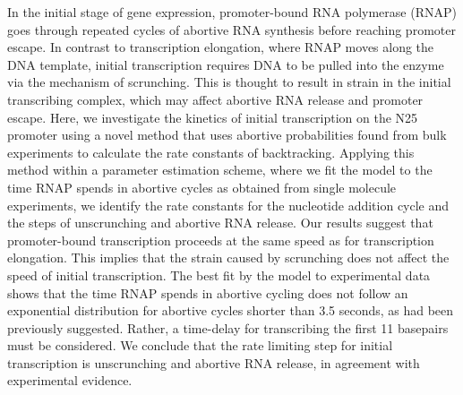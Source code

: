 In the initial stage of gene expression, promoter-bound RNA polymerase (RNAP)
goes through repeated cycles of abortive RNA synthesis before reaching
promoter escape. In contrast to transcription elongation, where RNAP moves
along the DNA template, initial transcription requires DNA to be pulled into
the enzyme via the mechanism of scrunching. This is thought to result in
strain in the initial transcribing complex, which may affect abortive RNA
release and promoter escape. Here, we investigate the kinetics of initial
transcription on the N25 promoter using a novel method that uses abortive
probabilities found from bulk experiments to calculate the rate constants of
backtracking. Applying this method within a parameter estimation scheme, where
we fit the model to the time RNAP spends in abortive cycles as obtained from
single molecule experiments, we identify the rate constants for the nucleotide
addition cycle and the steps of unscrunching and abortive RNA release. Our
results suggest that promoter-bound transcription proceeds at the same speed
as for transcription elongation. This implies that the strain caused by
scrunching does not affect the speed of initial transcription. The best fit by
the model to experimental data shows that the time RNAP spends in abortive
cycling does not follow an exponential distribution for abortive cycles
shorter than 3.5 seconds, as had been previously suggested. Rather, a
time-delay for transcribing the first 11 basepairs must be considered. We
conclude that the rate limiting step for initial transcription is unscrunching
and abortive RNA release, in agreement with experimental evidence. 
